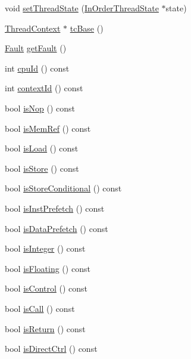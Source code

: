 \begin{DoxyCompactItemize}
\item 
void \hyperlink{classInOrderDynInst_aea755013a6e0d4b31968c7b95ae24750}{setThreadState} (\hyperlink{classInOrderThreadState}{InOrderThreadState} $\ast$state)
\item 
\hyperlink{classThreadContext}{ThreadContext} $\ast$ \hyperlink{classInOrderDynInst_ad33756f3e96ee445dca8d69b1dd8709c}{tcBase} ()
\item 
\hyperlink{classRefCountingPtr}{Fault} \hyperlink{classInOrderDynInst_ab9b1142cc382fcfba846b1998e6c2f17}{getFault} ()
\item 
int \hyperlink{classInOrderDynInst_a1e2d18ebf4e21f2416c21a8b072e2c7b}{cpuId} () const 
\item 
int \hyperlink{classInOrderDynInst_a651d5d14e7a4e95ebe6d7f5b8ee5a107}{contextId} () const 
\item 
bool \hyperlink{classInOrderDynInst_a45dbb9ace4c729e7bb701ce535fb1667}{isNop} () const 
\item 
bool \hyperlink{classInOrderDynInst_a9b0f2cd082a656c4b5f369b5362c2f5b}{isMemRef} () const 
\item 
bool \hyperlink{classInOrderDynInst_afef57d32aae2e0d962889f6e0537bf31}{isLoad} () const 
\item 
bool \hyperlink{classInOrderDynInst_a75d02c30242181ed8a68f61087c2242d}{isStore} () const 
\item 
bool \hyperlink{classInOrderDynInst_a7023ade89206ed967e6af7397cb744f8}{isStoreConditional} () const 
\item 
bool \hyperlink{classInOrderDynInst_ab7deedfb63be4690f506acd0444dde3a}{isInstPrefetch} () const 
\item 
bool \hyperlink{classInOrderDynInst_abe301c4b09b8eb65bc2203905b1abf53}{isDataPrefetch} () const 
\item 
bool \hyperlink{classInOrderDynInst_a06625615adfaf28305767ac42b1ef0a4}{isInteger} () const 
\item 
bool \hyperlink{classInOrderDynInst_a58024ee3f69c53c47ec5b315b78a7302}{isFloating} () const 
\item 
bool \hyperlink{classInOrderDynInst_a2ff117edfab9c8486802c441ac331086}{isControl} () const 
\item 
bool \hyperlink{classInOrderDynInst_aa2317a020504e552097abb001847f74c}{isCall} () const 
\item 
bool \hyperlink{classInOrderDynInst_a56f87bc75115f1dcea77803b01f40d2c}{isReturn} () const 
\item 
bool \hyperlink{classInOrderDynInst_ac218ba4230a8cd92999948288a54e14f}{isDirectCtrl} () const 

\end{DoxyCompactItemize}
